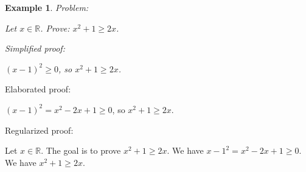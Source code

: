 \documentclass{article}
\newtheorem{example}{Example}
\begin{document}
\begin{example}
Problem:
\begin{tcolorbox}[colback=yellow!10, width=\linewidth]
Let $x\in\mathbb{R}$. Prove: $x^2 + 1\ge 2x$.
\end{tcolorbox}

Simplified proof:
\begin{tcolorbox}[colback=blue!10, width=\linewidth]
$(x-1)^2 \ge 0$, so $x^2 + 1 \ge 2x$.
\end{tcolorbox}
\end{example}

Elaborated proof:
\begin{tcolorbox}[colback=green!10, width=\linewidth]
$(x-1)^2 = x^2 - 2x + 1 \ge 0$, so $x^2 + 1 \ge 2x$.
\end{tcolorbox}

Regularized proof:
\begin{tcolorbox}[colback=red!10, width=\linewidth]
Let $x\in\mathbb{R}$.
The goal is to prove $x^2 + 1 \ge 2x$.
We have ${{x-1}}^2 = x^2 - 2x + 1 \ge 0$.
We have $x^2 + 1 \ge 2x$.
\end{tcolorbox}
\end{document}
